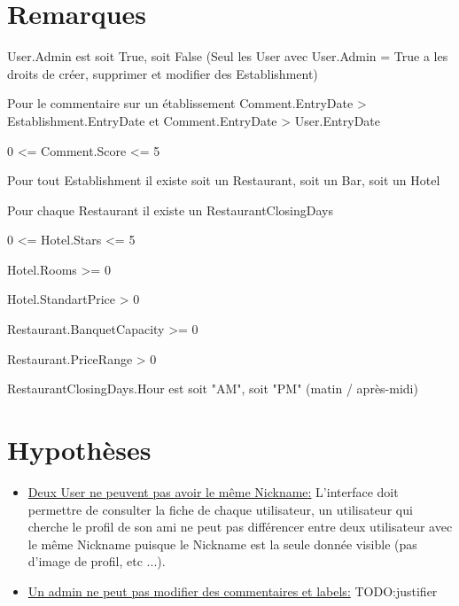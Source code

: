 \documentclass[11pt,a4paper]{report}
\begin{document}
\section*{Remarques}
\noindent

User.Admin est soit True, soit False (Seul les User avec User.Admin = True a les droits de créer, supprimer et modifier des Establishment)

Pour le commentaire sur un établissement Comment.EntryDate > Establishment.EntryDate et Comment.EntryDate > User.EntryDate

0 <= Comment.Score <= 5

Pour tout Establishment il existe soit un Restaurant, soit un Bar, soit un Hotel

Pour chaque Restaurant il existe un RestaurantClosingDays

0 <= Hotel.Stars <= 5

Hotel.Rooms >= 0

Hotel.StandartPrice > 0

Restaurant.BanquetCapacity >= 0

Restaurant.PriceRange > 0

RestaurantClosingDays.Hour est soit "AM", soit "PM" (matin / après-midi)




\section*{Hypothèses}
\noindent

\begin{itemize}
\item \underline{Deux User ne peuvent pas avoir le même Nickname:} L'interface doit permettre de consulter la fiche de chaque utilisateur, un utilisateur qui cherche le profil de son ami ne peut pas différencer entre deux utilisateur avec le même Nickname puisque le Nickname est la seule donnée visible (pas d'image de profil, etc ...).\\
\end{itemize}



\begin{itemize}
\item \underline{Un admin ne peut pas modifier des commentaires et labels:} TODO:justifier
\end{itemize}
\end{document}
